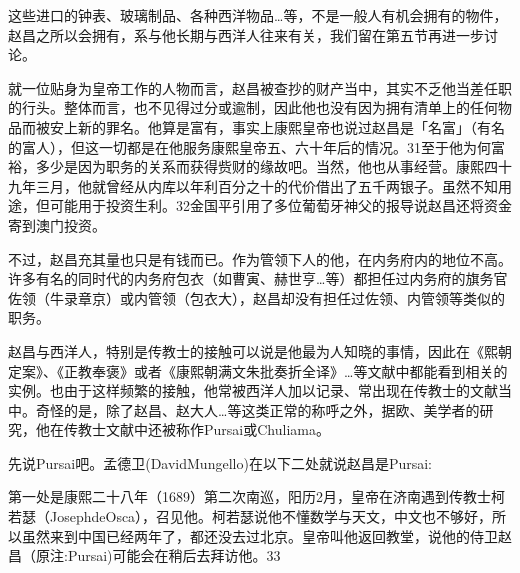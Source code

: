 这些进口的钟表、玻璃制品、各种西洋物品…等，不是一般人有机会拥有的物件，赵昌之所以会拥有，系与他长期与西洋人往来有关，我们留在第五节再进一步讨论。

就一位贴身为皇帝工作的人物而言，赵昌被查抄的财产当中，其实不乏他当差任职的行头。整体而言，也不见得过分或逾制，因此他也没有因为拥有清单上的任何物品而被安上新的罪名。他算是富有，事实上康熙皇帝也说过赵昌是「名富」（有名的富人），但这一切都是在他服务康熙皇帝五、六十年后的情况。31至于他为何富裕，多少是因为职务的关系而获得赀财的缘故吧。当然，他也从事经营。康熙四十九年三月，他就曾经从内库以年利百分之十的代价借出了五千两银子。虽然不知用途，但可能用于投资生利。32金国平引用了多位葡萄牙神父的报导说赵昌还将资金寄到澳门投资。

不过，赵昌充其量也只是有钱而已。作为管领下人的他，在内务府内的地位不高。许多有名的同时代的内务府包衣（如曹寅、赫世亨…等）都担任过内务府的旗务官佐领（牛录章京）或内管领（包衣大），赵昌却没有担任过佐领、内管领等类似的职务。

\vfill
\begin{BookNotes}
\end{BookNotes}


赵昌与西洋人，特别是传教士的接触可以说是他最为人知晓的事情，因此在《熙朝定案》、《正教奉褒》或者《康熙朝满文朱批奏折全译》…等文献中都能看到相关的实例。也由于这样频繁的接触，他常被西洋人加以记录、常出现在传教士的文献当中。奇怪的是，除了赵昌、赵大人…等这类正常的称呼之外，据欧、美学者的研究，他在传教士文献中还被称作Pursai或Chuliama。

先说Pursai吧。孟德卫(DavidMungello)在以下二处就说赵昌是Pursai:

第一处是康熙二十八年（1689）第二次南巡，阳历2月，皇帝在济南遇到传教士柯若瑟（JosephdeOsca），召见他。柯若瑟说他不懂数学与天文，中文也不够好，所以虽然来到中国已经两年了，都还没去过北京。皇帝叫他返回教堂，说他的侍卫赵昌（原注:Pursai)可能会在稍后去拜访他。33

